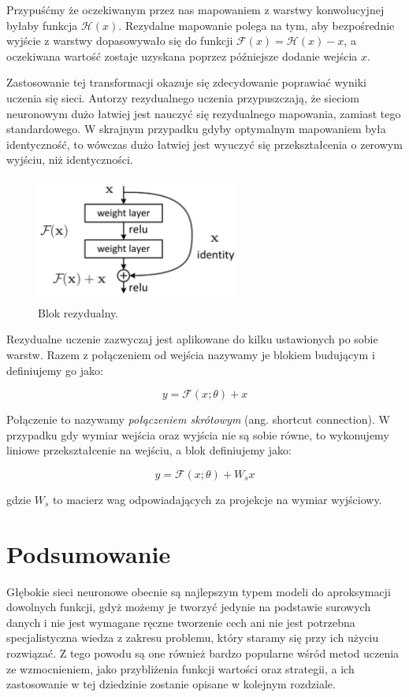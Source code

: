 \documentclass[licencjacka]{pracamgr}
\begin{document}
Przypuśćmy że oczekiwanym przez nas mapowaniem z warstwy konwolucyjnej byłaby funkcja $ \mathcal{H}(x) $. Rezydalne mapowanie polega na tym, aby bezpośrednie wyjście z warstwy dopasowywało się do funkcji $ \mathcal{F}(x) = \mathcal{H}(x) - x $, a oczekiwana wartość zostaje uzyskana poprzez późniejsze dodanie wejścia $x$. 

Zastosowanie tej transformacji okazuje się zdecydowanie poprawiać wyniki uczenia się sieci. Autorzy rezydualnego uczenia przypuszczają, że sieciom neuronowym dużo łatwiej jest nauczyć się rezydualnego mapowania, zamiast tego standardowego. W skrajnym przypadku gdyby optymalnym mapowaniem była identyczność, to wówczas dużo łatwiej jest wyuczyć się przekształcenia o zerowym wyjściu, niż identyczności.

\begin{figure}[ht!]
  \centering
  \includegraphics[width=0.6\textwidth]{res_block}
  \caption{Blok rezydualny. \cite{resnet}}
\end{figure}

Rezydualne uczenie zazwyczaj jest aplikowane do kilku ustawionych po sobie warstw. Razem z połączeniem od wejścia nazywamy je blokiem budującym i definiujemy go jako:

$$ y = \mathcal{F}(x; \theta) + x $$

Połączenie to nazywamy \emph{połączeniem skrótowym} (ang. shortcut connection). W przypadku gdy wymiar wejścia oraz wyjścia nie są sobie równe, to wykonujemy liniowe przekształcenie na wejściu, a blok definiujemy jako:

$$ y = \mathcal{F}(x; \theta) + W_sx $$

gdzie $W_s$ to macierz wag odpowiadających za projekcje na wymiar wyjściowy.

\section{Podsumowanie}

Głębokie sieci neuronowe obecnie są najlepszym typem modeli do aproksymacji dowolnych funkcji, gdyż możemy je tworzyć jedynie na podstawie surowych danych i nie jest wymagane ręczne tworzenie cech ani nie jest potrzebna specjalistyczna wiedza z zakresu problemu, który staramy się przy ich użyciu rozwiązać. Z tego powodu są one również bardzo popularne wśród metod uczenia ze wzmocnieniem, jako przybliżenia funkcji wartości oraz strategii, a ich zastosowanie w tej dziedzinie zostanie opisane w kolejnym rozdziale.
\end{document}
